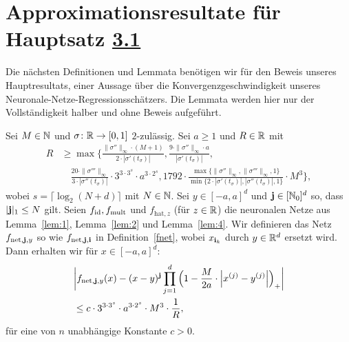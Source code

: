 \section{Approximationsresultate für Hauptsatz \hyperref[optstop]{3.1}}
Die nächsten  Definitionen und Lemmata benötigen wir für den Beweis unseres Hauptresultats, einer Aussage über die Konvergenzgeschwindigkeit unseres Neuronale-Netze-Regressionsschätzers. Die Lemmata werden hier nur der Vollständigkeit halber und ohne Beweis aufgeführt. 
\begin{lem}
\label{lem:5}
Sei $M \in \mathbb{N}$ und $\sigma\colon \mathbb{R} \to [0, 1]$ $2$-zulässig.
Sei $a \geq 1$ und $R \in \mathbb{R}$ mit
\begin{equation*}
\begin{split}
R & \geq \max\biggl\{\frac{\|\sigma''\|_{\infty} \cdot (M + 1)}{2 \cdot |\sigma'(t_{\sigma})|}, \frac{9 \cdot \|\sigma''\|_{\infty} \cdot a}{|\sigma'(t_{\sigma})|}, \\
& \quad \frac{20 \cdot \|\sigma'''\|_{\infty}}{3 \cdot |\sigma''(t_{\sigma})|} \cdot 3^{3 \cdot 3^s} \cdot a^{3 \cdot 2^s}, 1792 \cdot \frac{\max\{\|\sigma''\|_{\infty},\|\sigma'''\|_{\infty}, 1\}}{\min\{2 \cdot |\sigma'(t_{\sigma})|, |\sigma''(t_{\sigma})|, 1\}} \cdot M^3 \biggr\},
\end{split}
\end{equation*}
wobei $s = \lceil\log_2(N + d)\rceil$ mit $N \in \mathbb{N}$. Sei $y \in [-a, a]^d$ und $\mathbf{j} \in [\mathbb{N}_0]^d$ so, dass $|\mathbf{j}|_1 \leq N$ gilt. Seien $f_{\mathrm{id}}, f_{\mathrm{mult}}$ und $f_{\mathrm{hat}, z}$ (für $z \in \mathbb{R}$) die neuronalen Netze aus Lemma~\ref{lem:1}, Lemma~\ref{lem:2} und Lemma~\ref{lem:4}. Wir definieren das Netz $f_{\mathrm{net},\mathbf{j},y}$ so wie $f_{\mathrm{net},\mathbf{j},\mathbf{i}}$ in Definition~\ref{fnet}, wobei $x_{{\mathbf{i}}_k}$ durch $y \in \mathbb{R}^d$ ersetzt wird.
Dann erhalten wir für $x \in [-a, a]^d$:
\begin{equation*}
\begin{split}
& \bigg|f_{\mathrm{net},\mathbf{j},y}(x) - (x - y)^{\mathbf{j}} \prod_{j = 1}^d \Big(1 - \frac{M}{2a} \cdot \Big|x^{(j)} - y^{(j)}\Big|\Big)_+\bigg| \\
& \leq c \cdot 3^{3 \cdot 3^s} \cdot a^{3 \cdot 2^s} \cdot M^3 \cdot \frac{1}{R},
\end{split}
\end{equation*}
für eine von $n$ unabhängige Konstante $c > 0$.
\end{lem}

